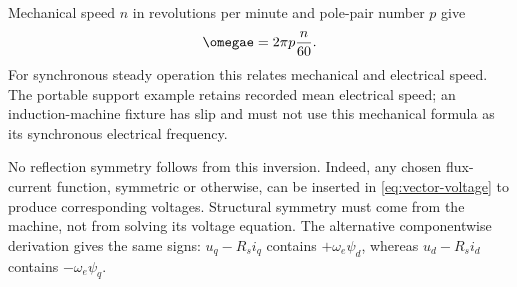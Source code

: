 Mechanical speed $n$ in revolutions per minute and pole-pair number $p$ give
\begin{equation}
 \omegae=2\pi p\frac{n}{60}.\label{eq:rpm-conversion}
\end{equation}
For synchronous steady operation this relates mechanical and electrical
speed. The portable support example retains recorded mean electrical speed;
an induction-machine fixture has slip and must not use this mechanical formula
as its synchronous electrical frequency.

No reflection symmetry follows from this inversion. Indeed, any chosen
flux-current function, symmetric or otherwise, can be inserted in
\cref{eq:vector-voltage} to produce corresponding voltages. Structural
symmetry must come from the machine, not from solving its voltage equation.
The alternative componentwise derivation gives the same signs: $u_q-R_si_q$
contains $+\omega_e\psi_d$, whereas $u_d-R_si_d$ contains
$-\omega_e\psi_q$.

